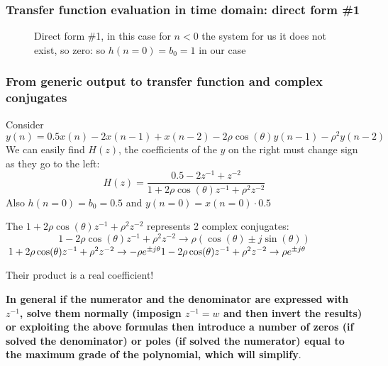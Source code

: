 \subsubsection{Transfer function evaluation in time domain: direct form \#1}
\begin{figure}[!ht]
    \begin{minipage}{\linewidth}
        \centering
        \caption{Direct form \#1, in this case for $n<0$ the system for us it does not exist, so zero: so $h(n=0)=b_0=1$ in our case}
    \end{minipage}
\end{figure}

\subsubsection{From generic output to transfer function and complex conjugates}
Consider
$$
y(n)=0.5x(n)-2x(n-1)+x(n-2)-2\rho\cos(\theta)y(n-1)-\rho^2y(n-2)
$$
We can easily find $H(z)$, the coefficients of the $y$ on the right must change sign as they go to the left:
$$
H(z)=\frac{
    0.5-2z^{-1}+z^{-2}
}{
    1+2\rho\cos(\theta)z^{-1}+\rho^2z^{-2}
}
$$
Also $h(n=0)=b_0=0.5$ and $y(n=0)=x(n=0)\cdot 0.5$

The $1+2\rho\cos(\theta)z^{-1}+\rho^2z^{-2}$ represents 2 complex conjugates:
$$
1-2\rho\cos(\theta)z^{-1}+\rho^2z^{-2}\rightarrow \rho(\cos(\theta)\pm j\sin(\theta))
$$
$
1+2\rho\cos(\theta)z^{-1}+\rho^2z^{-2}\rightarrow -\rho e^{\pm j\theta}
\\
1-2\rho\cos(\theta)z^{-1}+\rho^2z^{-2}\rightarrow \rho e^{\pm j\theta}
$

Their product is a real coefficient!

\textbf{In general if the numerator and the denominator are expressed with $z^{-1}$, solve them normally (imposign $z^{-1}=w$ and then invert the results) or exploiting the above formulas then introduce a number of zeros (if solved the denominator) or poles (if solved the numerator) equal to the maximum grade of the polynomial, which will simplify}.

